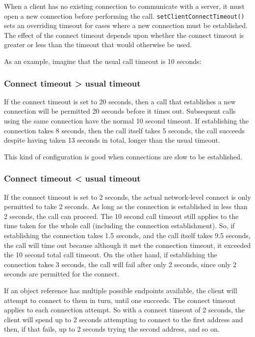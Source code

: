 \documentclass[11pt,twoside,a4paper]{book}
\newcommand{\op}[1]{\texttt{#1()}}
\newcommand{\dsc}{\discretionary{}{}{}}
\begin{document}
When a client has no existing connection to communicate with a server,
it must open a new connection before performing the
call. \op{setClientConnect\dsc{}Timeout} sets an overriding timeout for
cases where a new connection must be established. The effect of the
connect timeout depends upon whether the connect timeout is greater
or less than the timeout that would otherwise be used.

\vspace{\baselineskip}\noindent
As an example, imagine that the usual call timeout is 10 seconds:

\subsubsection*{Connect timeout > usual timeout}

If the connect timeout is set to 20 seconds, then a call that
establishes a new connection will be permitted 20 seconds before it
times out. Subsequent calls using the same connection have the normal
10 second timeout. If establishing the connection takes 8 seconds,
then the call itself takes 5 seconds, the call succeeds despite having
taken 13 seconds in total, longer than the usual timeout.

This kind of configuration is good when connections are slow to be
established.

\subsubsection*{Connect timeout < usual timeout}

If the connect timeout is set to 2 seconds, the actual network-level
connect is only permitted to take 2 seconds. As long as the connection
is established in less than 2 seconds, the call can proceed. The 10
second call timeout still applies to the time taken for the whole call
(including the connection establishment). So, if establishing the
connection takes 1.5 seconds, and the call itself takes 9.5 seconds,
the call will time out because although it met the connection timeout,
it exceeded the 10 second total call timeout. On the other hand, if
establishing the connection takes 3 seconds, the call will fail after
only 2 seconds, since only 2 seconds are permitted for the connect.

If an object reference has multiple possible endpoints available, the
client will attempt to connect to them in turn, until one succeeds.
The connect timeout applies to each connection attempt. So with a
connect timeout of 2 seconds, the client will spend up to 2 seconds
attempting to connect to the first address and then, if that fails, up
to 2 seconds trying the second address, and so on.
\end{document}
